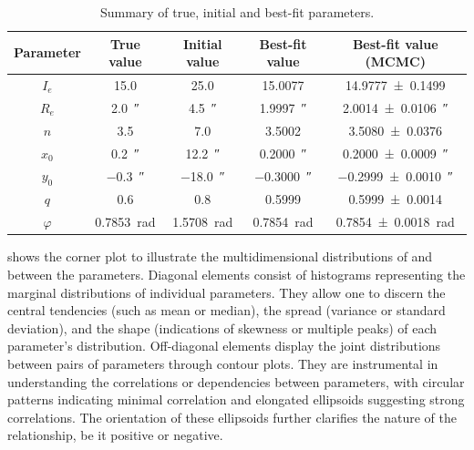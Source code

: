 \begin{table}[]
\setlength{\extrarowheight}{2pt}
\setlength{\tabcolsep}{1pt}
\centering
\caption{Summary of true, initial and best-fit parameters.}
\label{tab:parameters_2}
\begin{tabular}{@{}c@{\hskip 20pt}c@{}@{\hskip 20pt}c@{}@{\hskip 20pt}c@{}@{\hskip 20pt}c@{}}
\toprule
Parameter   & True value            & Initial value             & Best-fit value            & Best-fit value (MCMC) \\ \midrule
$I_e$       & \SI{15.0}{}           & \SI{25.0}{}               & \SI{15.0077}{}            & \SI[separate-uncertainty=true]{14.9777 \pm 0.1499}{} \\
$R_e$       & \SI{2.0}{\arcsecond}  & \SI{4.5}{\arcsecond}      & \SI{1.9997}{\arcsecond}   & \SI[separate-uncertainty=true]{2.0014 \pm 0.0106}{\arcsecond} \\
$n$         & \SI{3.5}{}            & \SI{7.0}{}                & \SI{3.5002}{}             & \SI[separate-uncertainty=true]{3.5080 \pm 0.0376}{} \\
$x_0$       & \SI{0.2}{\arcsecond}  & \SI{12.2}{\arcsecond}     & \SI{0.2000}{\arcsecond}   & \SI[separate-uncertainty=true]{0.2000 \pm 0.0009}{\arcsecond}\\
$y_0$       & \SI{-0.3}{\arcsecond} & \SI{-18.0}{\arcsecond}    & \SI{-0.3000}{\arcsecond}  & \SI[separate-uncertainty=true]{-0.2999 \pm 0.0010}{\arcsecond}   \\
$q$         & \SI{0.6}{}            & \SI{0.8}{}                & \SI{0.5999}{}            & \SI[separate-uncertainty=true]{0.5999 \pm 0.0014}{}  \\
$\varphi$   & \SI{0.7853}{\radian}  & \SI{1.5708}{\radian}      & \SI{0.7854}{\radian}      & \SI[separate-uncertainty=true]{0.7854 \pm 0.0018}{\radian}\\ \bottomrule
\end{tabular}
\end{table}

 shows the corner plot to illustrate the multidimensional distributions of and between the parameters. Diagonal elements consist of histograms representing the marginal distributions of individual parameters. They allow one to discern the central tendencies (such as mean or median), the spread (variance or standard deviation), and the shape (indications of skewness or multiple peaks) of each parameter's distribution. Off-diagonal elements display the joint distributions between pairs of parameters through contour plots. They are instrumental in understanding the correlations or dependencies between parameters, with circular patterns indicating minimal correlation and elongated ellipsoids suggesting strong correlations. The orientation of these ellipsoids further clarifies the nature of the relationship, be it positive or negative.

